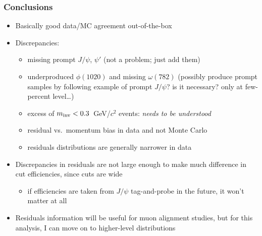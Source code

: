 \documentclass[compress]{beamer}
\newcommand{\s}[1]{{\mbox{\scriptsize #1}}}
\begin{document}
\begin{frame}
\frametitle{Conclusions}
\begin{itemize}
\item Basically good data/MC agreement out-of-the-box
\item Discrepancies:
\begin{itemize}\setlength{\itemsep}{0.1 cm}
\item missing prompt $J/\psi$, $\psi'$ (not a problem; just add them)
\item underproduced $\phi(1020)$ and missing $\omega(782)$ {\scriptsize (possibly produce prompt samples by following example of prompt $J/\psi$? is it necessary?  only at few-percent level\ldots)}
\item excess of $m_\s{inv} < 0.3$~GeV/$c^2$ events: {\it needs to be understood}
\item residual vs.\ momentum bias in data and not Monte Carlo
\item residuals distributions are generally narrower in data
\end{itemize}

\item Discrepancies in residuals are not large enough to make much
  difference in cut efficiencies, since cuts are wide
\begin{itemize}
\item if efficiencies are taken from $J/\psi$ tag-and-probe in the
  future, it won't matter at all
\end{itemize}

\item Residuals information will be useful for muon alignment studies,
  but for this analysis, I can move on to higher-level distributions
\end{itemize}

\label{numpages}
\end{frame}
\end{document}

